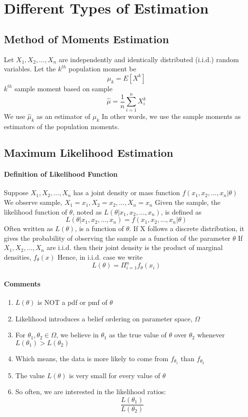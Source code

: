 \documentclass[11pt]{article}
\begin{document}
\section{Different Types of Estimation}
\subsection{Method of Moments Estimation}
Let $X_1, X_2, ..., X_n$ are independently and identically distributed (i.i.d.) random variables. \newline
Let the $k^{th}$ population moment be
$$\mu_k = E[X^k]$$
$k^{th}$ sample moment based on sample
$$\hat{\mu} = \frac{1}{n}\sum_{i=1}^{n}X^k_i$$
We use $\hat{\mu}_k$ as an estimator of $\mu_k$ \newline
In other words, we use the sample moments as estimators of the population moments.
\subsection{Maximum Likelihood Estimation}
\paragraph{Definition of Likelihood Function}
Suppose $X_1, X_2,...,X_n$ has a joint density or mass function $f(x_1, x_2,...,x_n|\theta)$ \newline
We observe sample, $X_1 = x_1, X_2 = x_2, ..., X_n = x_n$ \newline
Given the sample, the likelihood function of $\theta$, noted as $L(\theta|x_1, x_2,...,x_n)$, is defined as
$$L(\theta|x_1, x_2,...,x_n) = f(x_1, x_2,...,x_n|\theta)$$
Often written as $L(\theta)$, is a function of $\theta$. \newline
If X follows a discrete distribution, it gives the probability of observing the sample as a function of the parameter $\theta$ \newline
If $X_1, X_2,...,X_n$ are i.i.d. then their joint density is the product of marginal densities, $f_\theta(x)$\newline
Hence, in i.i.d. case we write
$$L(\theta) = \Pi_{i=1}^n f_\theta(x_i)$$
\paragraph{Comments}
\begin{enumerate}
	\item $L(\theta)$ is NOT a pdf or pmf of $\theta$
	\item Likelihood introduces a belief ordering on parameter space, $\Omega$
	\item For $\theta_1, \theta_2 \in \Omega$, we believe in $\theta_1$ as the true value of $\theta$ over $\theta_2$ whenever $L(\theta_1) > L(\theta_2)$
	\item Which means, the data is more likely to come from $f_{\theta_1}$ than $f_{\theta_2}$
	\item The value $L(\theta)$ is very small for every value of $\theta$
	\item So often, we are interested in the likelihood ratios:
	$$\frac{L(\theta_1)}{L(\theta_2)}$$
\end{enumerate}
\end{document}
